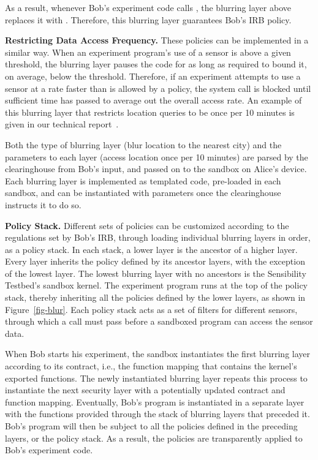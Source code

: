 As a result, whenever Bob's experiment code calls , 
the blurring layer above replaces it with . Therefore,
this blurring layer guarantees Bob's IRB policy.

\textbf{Restricting Data Access Frequency.}
These policies can be implemented in a similar way. When an experiment 
program's use of a sensor is above a given threshold, the blurring layer 
pauses the code for as long as required to bound it, on average, below 
the threshold. Therefore, if an experiment attempts to use a sensor at a 
rate faster than is allowed by a policy, the system call is blocked until 
sufficient time has passed to average out the overall access rate. An example
of this blurring layer that restricts location queries to be once per 10 minutes
is given in our technical report~\cite{zhuangTR15}.

Both the type of blurring layer (blur location to the nearest city) and the 
parameters to each layer (access location once per 10 minutes) are parsed
by the clearinghouse from Bob's input, and passed on to the sandbox on 
Alice's device. Each blurring layer is implemented as templated code, 
pre-loaded in each sandbox, and can be instantiated with parameters 
once the clearinghouse instructs it to do so.

\textbf{Policy Stack.}
Different sets of policies can be customized 
according to the regulations set by Bob's IRB, through loading 
individual blurring layers in order, as a policy stack. In each stack, 
a lower layer is the ancestor of a higher layer. Every layer inherits 
the policy defined by its ancestor layers, with the exception of the lowest layer. 
The lowest blurring layer with no ancestors is the 
Sensibility Testbed's sandbox kernel. The experiment program runs at the top 
of the policy stack, thereby inheriting all the policies defined by the
lower layers, as shown in Figure~\ref{fig-blur}. 
Each policy stack acts as a set of filters for different sensors, through 
which a call must pass before a sandboxed program can
access the sensor data. 

When Bob starts his experiment, the sandbox %
instantiates the first blurring layer according to its contract, i.e., the function 
mapping that contains the kernel's exported functions.
The newly instantiated blurring layer repeats this process 
to instantiate the next security layer with a potentially updated contract and 
function mapping. Eventually, Bob's program is instantiated
in a separate layer with the functions provided
through the stack of blurring layers that preceded it.
Bob's program will then be subject to all the 
policies defined in the preceding layers, or the policy stack. 
As a result,  the policies are transparently applied to Bob's experiment code. 

